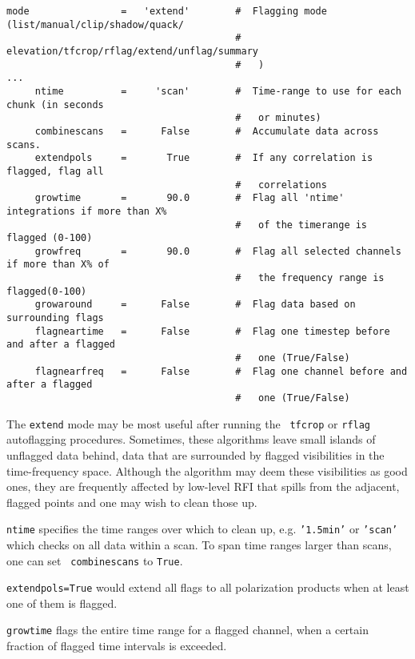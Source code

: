 \small
\begin{verbatim}
mode                =   'extend'        #  Flagging mode (list/manual/clip/shadow/quack/
                                        #   elevation/tfcrop/rflag/extend/unflag/summary
                                        #   )
...
     ntime          =     'scan'        #  Time-range to use for each chunk (in seconds
                                        #   or minutes)
     combinescans   =      False        #  Accumulate data across scans.
     extendpols     =       True        #  If any correlation is flagged, flag all
                                        #   correlations
     growtime       =       90.0        #  Flag all 'ntime' integrations if more than X%
                                        #   of the timerange is flagged (0-100)
     growfreq       =       90.0        #  Flag all selected channels if more than X% of
                                        #   the frequency range is flagged(0-100)
     growaround     =      False        #  Flag data based on surrounding flags
     flagneartime   =      False        #  Flag one timestep before and after a flagged
                                        #   one (True/False)
     flagnearfreq   =      False        #  Flag one channel before and after a flagged
                                        #   one (True/False)

\end{verbatim}
\normalsize

The {\tt extend} mode may be most useful after running the {\tt
  tfcrop} or {\tt rflag} autoflagging procedures. Sometimes, these
algorithms leave small islands of unflagged data behind, data that are
surrounded by flagged visibilities in the time-frequency
space. Although the algorithm may deem these visibilities as good
ones, they are frequently affected by low-level RFI that spills from
the adjacent, flagged points and one may wish to clean those up.


{\tt ntime} specifies the time ranges over which to clean up,
e.g. {\tt '1.5min'} or {\tt 'scan'} which checks on all data within a
scan. To span time ranges larger than scans, one can set {\tt
  combinescans} to {\tt True}.

{\tt extendpols=True} would extend all flags to all polarization
products when at least one of them is flagged.

{\tt growtime} flags the entire time range for a flagged channel,
when a certain fraction of flagged time intervals is exceeded. 


